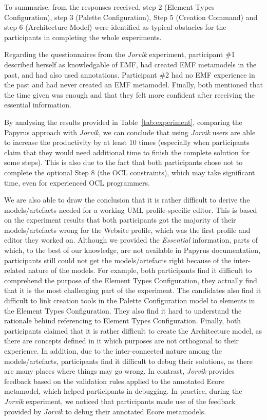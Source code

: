 To summarise, from the responses received, step 2 (Element Types Configuration), step 3 (Palette Configuration), Step 5 (Creation Command) and step 6 (Architecture Model) were identified as typical obstacles for the participants in completing the whole experiments. 

Regarding the questionnaires from the \textit{Jorvik} experiment, participant \#1 described herself as knowledgable of EMF, had created EMF metamodels in the past, and had also used annotations. 
Participant \#2 had no EMF experience in the past and had never created an EMF metamodel. Finally, both mentioned that the time given was enough and that they felt more confident after receiving the essential information.

By analysing the results provided in Table~\ref{tab:experiment}, comparing the Papyrus approach with \textit{Jorvik}, we can conclude that using \textit{Jorvik} users are able to increase the productivity by at least 10 times (especially when participants claim that they would need additional time to finish the complete solution for some steps). This is also due to the fact that both participants chose not to complete the optional Step 8 (the OCL constraints), which may take significant time, even for experienced OCL programmers.

We are also able to draw the conclusion that it is rather difficult to derive the models/artefacts needed for a working UML profile-specific editor. 
This is based on the experiment results that both participants got the majority of their models/artefacts wrong for the Website profile, which was the first profile and editor they worked on.
Although we provided the \textit{Essential} information, parts of which, to the best of our knowledge, are not available in Papyrus documentation, participants still could not get the models/artefacts right because of the inter-related nature of the models.
For example, both participants find it difficult to comprehend the purpose of the Element Types Configuration, they actually find that it is the most challenging part of the experiment.
The candidates also find it difficult to link creation tools in the Palette Configuration model to elements in the Element Types Configuration. 
They also find it hard to understand the rationale behind referencing to Element Types Configuration.
Finally, both participants claimed that it is rather difficult to create the Architecture model, as there are concepts defined in it which purposes are not orthogonal to their experience.
In addition, due to the inter-connected nature among the models/artefacts, participants find it difficult to debug their solutions, as there are many places where things may go wrong.
In contrast, \textit{Jorvik} provides feedback based on the validation rules applied to the annotated Ecore metamodel, which helped participants in debugging.
In practice, during the \textit{Jorvik} experiment, we noticed that participants made use of the feedback provided by \textit{Jorvik} to debug their annotated Ecore metamodels.

